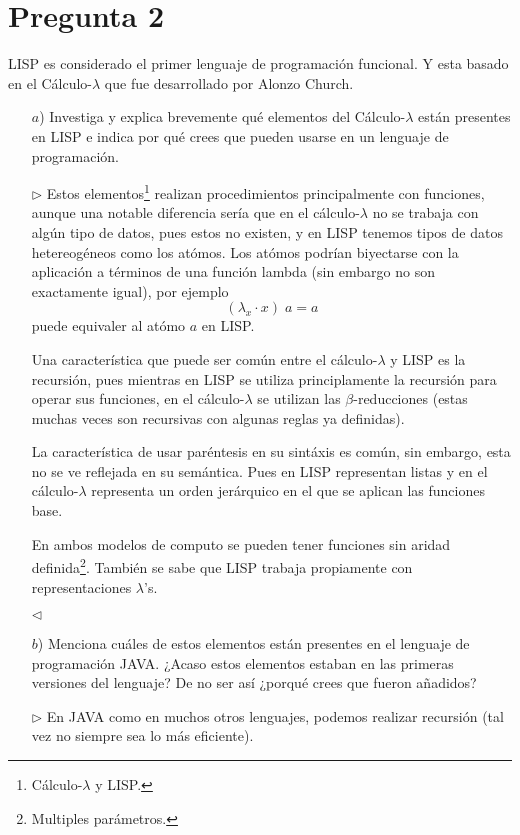 \newpage
\section*{Pregunta 2}

LISP es considerado el primer lenguaje de programación funcional. Y esta basado en el Cálculo-$\lambda$ que fue desarrollado por Alonzo Church.

\begin{enumerate}
\item[$a$)] Investiga y explica brevemente qué elementos del Cálculo-$\lambda$
están presentes en LISP e indica por qué crees que pueden usarse en un
lenguaje de programación.

$\rhd$ Estos elementos\footnote{Cálculo-$\lambda$ y LISP.} realizan
procedimientos principalmente con funciones, aunque una notable diferencia
sería que en el cálculo-$\lambda$ no se trabaja con algún tipo de datos,
pues estos no existen, y en LISP tenemos tipos de datos hetereogéneos como
los atómos. Los atómos podrían biyectarse con la aplicación a términos de
una función lambda (sin embargo no son exactamente igual), por ejemplo
\[
(\lambda_x \cdot x)\; a = a
\]
puede equivaler al atómo $a$ en LISP.

Una característica que puede ser común entre el cálculo-$\lambda$ y LISP es
la recursión, pues mientras en LISP se utiliza principlamente la recursión
para operar sus funciones, en el cálculo-$\lambda$ se utilizan las $\beta$-reducciones
(estas muchas veces son recursivas con algunas reglas ya definidas).

La característica de usar paréntesis en su sintáxis es común, sin embargo, esta
no se ve reflejada en su semántica. Pues en LISP representan listas y en el
cálculo-$\lambda$ representa un orden jerárquico en el que se aplican las funciones
base.

En ambos modelos de computo se pueden tener funciones sin aridad definida\footnote{Multiples
parámetros.}. También se sabe que LISP trabaja propiamente con representaciones $\lambda$'s.

\hfill $\lhd$
\item[$b$)] Menciona cuáles de estos elementos están presentes en el lenguaje de programación JAVA.
¿Acaso estos elementos estaban en las primeras versiones del lenguaje? De no ser así ¿porqué
crees que fueron añadidos?

$\rhd$ En JAVA como en muchos otros lenguajes, podemos realizar recursión (tal vez no siempre sea
lo más eficiente).


\end{enumerate}
